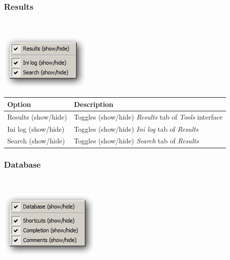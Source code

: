 \hypertarget{menu_view_tools_resources_results}{}
\subsubsection{Results}\\

\includegraphics[scale=0.50]{./res/menu_view_tools_resources_results.png}\\

\begin{scriptsize}\begin{tabularx}{\textwidth}{>{\hsize=0.3\hsize}X>{\hsize=0.7\hsize}X}\\
    \hline
    \textbf{Option} & \textbf{Description} \\
    \hline
    Results (show/hide) & Toggles (show/hide) \textit{Results} tab of \textit{Tools} interface \\
    Ini log (show/hide) & Toggles (show/hide) \textit{Ini log} tab of \textit{Results} \\
    Search (show/hide) & Toggles (show/hide) \textit{Search} tab of \textit{Results} \\
    \hline
  \end{tabularx}\end{scriptsize}


\hypertarget{menu_view_tools_resources_database}{}
\subsubsection{Database}\\

\includegraphics[scale=0.50]{./res/menu_view_tools_resources_database.png}\\


